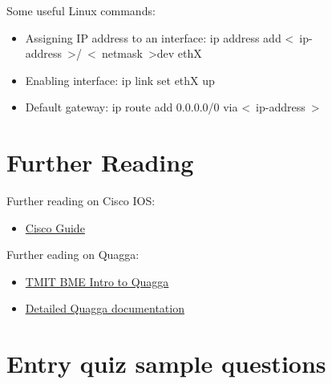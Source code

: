 \documentclass[a4paper]{article}
\begin{document}
Some useful Linux commands:

\begin{itemize}
    \item Assigning IP address to an interface: ip address add
          \textless~ip-address~\textgreater/~\textless~netmask~\textgreater dev ethX
    \item Enabling interface: ip link set ethX up
    \item Default gateway: ip route add 0.0.0.0/0 via \textless~ip-address~\textgreater
\end{itemize}

\section{Further Reading}\label{sec:further-reading}
Further reading on Cisco IOS:
\begin{itemize}
    \item \href{https://qosip.tmit.bme.hu/foswiki/pub/Meres/SwitchLinkekAggregalasaFeladatok/cisco_guide_en.doc}{Cisco Guide}
\end{itemize}

Further eading on Quagga:
\begin{itemize}
    \item \href{http://unixlinux.tmit.bme.hu/Quagga}{TMIT BME Intro to Quagga}
    \item \href{http://downloads.pf.itd.nrl.navy.mil/docs/ospf-manet/quagga.pdf}{Detailed Quagga documentation}
\end{itemize}

\appendix


\section{Entry quiz sample questions}
\end{document}
